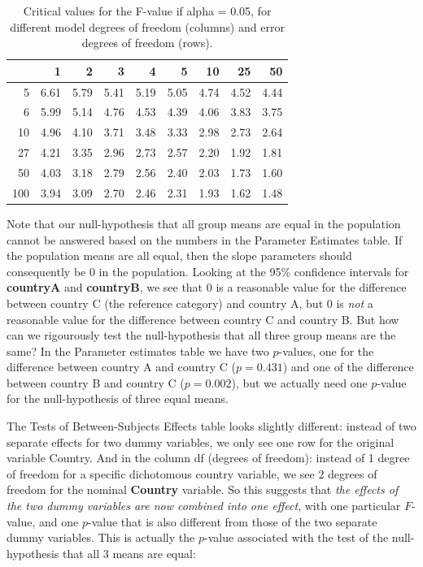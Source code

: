 \documentclass[]{book}\usepackage[]{graphicx}\usepackage[]{color}
\begin{document}
\begin{table}[ht]
\centering
\caption{Critical values for the F-value if alpha = 0.05, for different model degrees of freedom (columns) and error degrees of freedom (rows).} 
\label{tab:F_0.05}
\begin{tabular}{rrrrrrrrr}
  \hline
 & 1 & 2 & 3 & 4 & 5 & 10 & 25 & 50 \\ 
  \hline
5 & 6.61 & 5.79 & 5.41 & 5.19 & 5.05 & 4.74 & 4.52 & 4.44 \\ 
  6 & 5.99 & 5.14 & 4.76 & 4.53 & 4.39 & 4.06 & 3.83 & 3.75 \\ 
  10 & 4.96 & 4.10 & 3.71 & 3.48 & 3.33 & 2.98 & 2.73 & 2.64 \\ 
  27 & 4.21 & 3.35 & 2.96 & 2.73 & 2.57 & 2.20 & 1.92 & 1.81 \\ 
  50 & 4.03 & 3.18 & 2.79 & 2.56 & 2.40 & 2.03 & 1.73 & 1.60 \\ 
  100 & 3.94 & 3.09 & 2.70 & 2.46 & 2.31 & 1.93 & 1.62 & 1.48 \\ 
   \hline
\end{tabular}
\end{table}






Note that our null-hypothesis that all group means are equal in the population cannot be answered based on the numbers in the Parameter Estimates table. If the population means are all equal, then the slope parameters should consequently be 0 in the population. Looking at the 95\% confidence intervals for \textbf{countryA} and \textbf{countryB}, we see that 0 is a reasonable value for the difference between country C (the reference category) and country A, but 0 is \textit{not} a reasonable value for the difference between country C and country B. But how can we rigourously test the null-hypothesis that all three group means are the same? In the Parameter estimates table we have two $p$-values, one for the difference between country A and country C ($p=0.431$) and one of the difference between country B and country C ($p=0.002$), but we actually need one $p$-value for the null-hypothesis of three equal means. 

The Tests of Between-Subjects Effects table looks slightly different: instead of two separate effects for two dummy variables, we only see one row for the original variable Country. And in the column df (degrees of freedom): instead of 1 degree of freedom for a specific dichotomous country variable, we see 2 degrees of freedom for the nominal \textbf{Country} variable. So this suggests that \textit{the effects of the two dummy variables are now combined into one effect}, with one particular $F$-value, and one $p$-value that is also different from those of the two separate dummy variables. This is actually the $p$-value associated with the test of the null-hypothesis that all 3 means are equal: 
\end{document}
